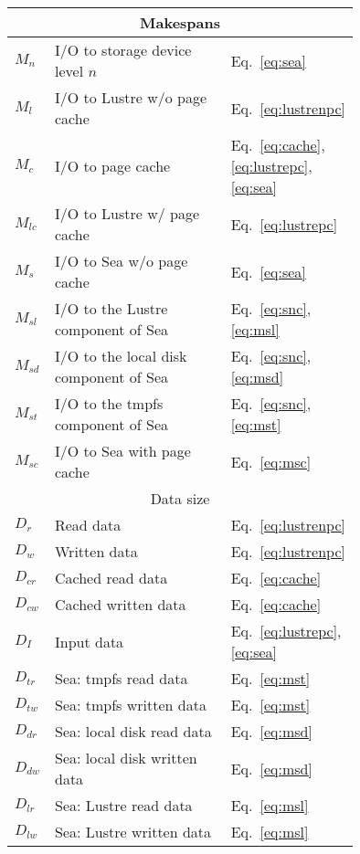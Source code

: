 \documentclass[10pt,journal,compsoc]{IEEEtran}
\begin{document}
      \begin{table}
      \centering
      \begin{tabular}{|p{0.05\linewidth}|p{0.6\linewidth}|p{0.1\linewidth}|}
       \hline
       \multicolumn{3}{|c|}{Makespans} \\
       \hline
       $M_{n}$ & I/O to storage device level $n$ & Eq.~\ref{eq:sea}\\
       $M_{l}$ & I/O to Lustre w/o page cache & Eq.~\ref{eq:lustrenpc}\\
       $M_{c}$ & I/O to page cache & Eq.~\ref{eq:cache}, \ref{eq:lustrepc}, \ref{eq:sea}\\
       $M_{lc}$ & I/O to Lustre w/ page cache & Eq.~\ref{eq:lustrepc}\\
       $M_{s}$ &  I/O to Sea w/o page cache & Eq.~\ref{eq:sea}\\
       $M_{sl}$ & I/O to the Lustre component of Sea & Eq.~\ref{eq:snc}, \ref{eq:msl} \\
       $M_{sd}$ & I/O to the local disk component of Sea & Eq.~\ref{eq:snc}, \ref{eq:msd} \\
       $M_{st}$ & I/O to the tmpfs component of Sea & Eq.~\ref{eq:snc}, \ref{eq:mst} \\
       $M_{sc}$ & I/O to Sea with page cache & Eq.~\ref{eq:msc} \\
       \hline
       \multicolumn{3}{|c|}{Data size} \\
       \hline
       $D_{r}$ & Read data & Eq.~\ref{eq:lustrenpc}\\
       $D_{w}$ & Written data & Eq.~\ref{eq:lustrenpc}\\
       $D_{cr}$ & Cached read data & Eq.~\ref{eq:cache}\\
       $D_{cw}$ & Cached written data & Eq.~\ref{eq:cache}\\
       $D_{I}$ & Input data & Eq.~\ref{eq:lustrepc}, \ref{eq:sea}\\
       $D_{tr}$ & Sea: tmpfs read data & Eq.~\ref{eq:mst} \\
       $D_{tw}$ & Sea: tmpfs written data & Eq.~\ref{eq:mst} \\
       $D_{dr}$ & Sea: local disk read data & Eq.~\ref{eq:msd} \\
       $D_{dw}$ & Sea: local disk written data & Eq.~\ref{eq:msd} \\
       $D_{lr}$ & Sea: Lustre read data & Eq.~\ref{eq:msl} \\
       $D_{lw}$ & Sea: Lustre written data & Eq.~\ref{eq:msl} \\

\end{tabular}
\end{table}
\end{document}

